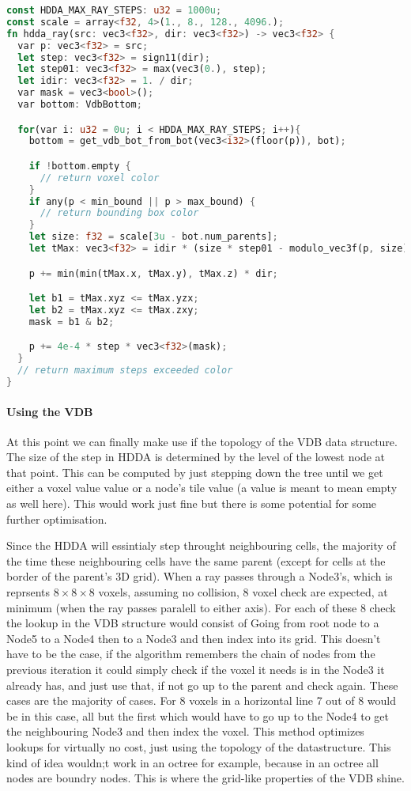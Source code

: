 \begin{lstlisting}[language=rust, captionpos=b, caption={\texttt{HDDA} algorithm}, label={hdda:code}]
const HDDA_MAX_RAY_STEPS: u32 = 1000u;
const scale = array<f32, 4>(1., 8., 128., 4096.);
fn hdda_ray(src: vec3<f32>, dir: vec3<f32>) -> vec3<f32> {
  var p: vec3<f32> = src;
  let step: vec3<f32> = sign11(dir);
  let step01: vec3<f32> = max(vec3(0.), step);
  let idir: vec3<f32> = 1. / dir;
  var mask = vec3<bool>();
  var bottom: VdbBottom;

  for(var i: u32 = 0u; i < HDDA_MAX_RAY_STEPS; i++){
    bottom = get_vdb_bot_from_bot(vec3<i32>(floor(p)), bot);

    if !bottom.empty {
      // return voxel color
    }
    if any(p < min_bound || p > max_bound) {
      // return bounding box color
    }
    let size: f32 = scale[3u - bot.num_parents];
    let tMax: vec3<f32> = idir * (size * step01 - modulo_vec3f(p, size));

    p += min(min(tMax.x, tMax.y), tMax.z) * dir;

    let b1 = tMax.xyz <= tMax.yzx;
    let b2 = tMax.xyz <= tMax.zxy;
    mask = b1 & b2;

    p += 4e-4 * step * vec3<f32>(mask);
  }
  // return maximum steps exceeded color
}
\end{lstlisting}

\paragraph{Using the VDB}
At this point we can finally make use if the topology of the VDB data structure.
The size of the step in HDDA is determined by the level of the lowest node at that point.
This can be computed by just stepping down the tree until we get either a voxel value value or a node's tile value (a value is meant to mean empty as well here).
This would work just fine but there is some potential for some further optimisation.

Since the HDDA will essintialy step throught neighbouring cells, the majority of the time these neighbouring cells have the same parent (except for cells at the border of the parent's 3D grid).
When a ray passes through a Node3's, which is reprsents $8\times8\times8$ voxels, assuming no collision, 8 voxel check are expected, at minimum (when the ray passes paralell to either axis).
For each of these 8 check the lookup in the VDB structure would consist of Going from root node to a Node5 to a Node4 then to a Node3 and then index into its grid.
This doesn't have to be the case, if the algorithm remembers the chain of nodes from the previous iteration it could simply check if the voxel it needs is in the Node3 it already has,
and just use that, if not go up to the parent and check again. These cases are the majority of cases. For 8 voxels in a horizontal line 7 out of 8 would be in this case,
all but the first which would have to go up to the Node4 to get the neighbouring Node3 and then index the voxel.
This method optimizes lookups for virtually no cost, just using the topology of the datastructure. This kind of idea wouldn;t work in an octree for example, because in an octree all nodes are boundry nodes.
This is where the grid-like properties of the VDB shine.

